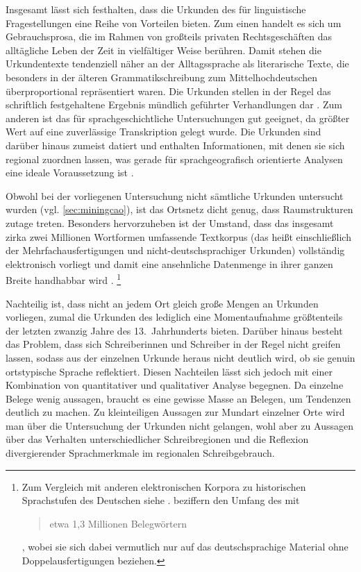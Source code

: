 Insgesamt lässt sich festhalten, dass die Urkunden des \CAO{} für
linguistische Fragestellungen eine Reihe von Vorteilen bieten. Zum einen
handelt es sich um Gebrauchsprosa, die im Rahmen von großteils privaten
Rechtsgeschäften das alltägliche Leben der Zeit in vielfältiger Weise berühren.
Damit stehen die Urkundentexte tendenziell näher an der Alltagssprache als
literarische Texte, die besonders in der älteren Grammatikschreibung zum
Mittelhochdeutschen überproportional repräsentiert waren. Die Urkunden stellen
in der Regel das schriftlich festgehaltene Ergebnis mündlich geführter
Verhandlungen dar \autocite[595]{schmidtwiegand1998b}. Zum anderen ist das
\CAO{} für sprachgeschichtliche Untersuchungen gut geeignet, da
größter Wert auf eine zuverlässige Transkription gelegt wurde. Die Urkunden
sind darüber hinaus zumeist datiert und enthalten Informationen, mit denen sie
sich regional zuordnen lassen, was gerade für sprachgeografisch orientierte
Analysen eine ideale Voraussetzung ist \autocite[22]{schulze2011}.

Obwohl bei der vorliegenen Untersuchung nicht sämtliche Urkunden untersucht
wurden (vgl. \cref{sec:miningcao}), ist das Ortsnetz dicht genug, dass
Raumstrukturen zutage treten. Besonders hervorzuheben ist der Umstand, dass das
insgesamt zirka zwei Millionen Wortformen umfassende Textkorpus (das heißt
einschließlich der Mehrfachausfertigungen und nicht-deutschsprachiger Urkunden)
vollständig elektronisch vorliegt \autocites{gniffkerapp2005}{cao-online} und
damit eine ansehnliche Datenmenge in ihrer ganzen Breite handhabbar wird
\autocite{beckerschallert2021,beckerschallert2022b}.%
%
	\footnote{Zum Vergleich mit anderen elektronischen Korpora zu historischen
	Sprachstufen des Deutschen siehe \citet{dipper2015}.
	\citet[391]{gniffkerapp2005} beziffern den Umfang des \CAO{} mit
	\blockquote{etwa 1,3 Millionen Belegwörtern}, wobei sie sich dabei
	vermutlich nur auf das deutschsprachige Material ohne Doppelausfertigungen
	beziehen.} %

Nachteilig ist, dass nicht an jedem Ort gleich große Mengen an Urkunden
vorliegen, zumal die Urkunden des \CAO{} lediglich eine Momentaufnahme
größtenteils der letzten zwanzig Jahre des 13.~Jahrhunderts bieten. Darüber
hinaus besteht das Problem, dass sich Schreiberinnen und Schreiber in der Regel
nicht greifen lassen, sodass aus der einzelnen Urkunde heraus nicht deutlich
wird, ob sie genuin ortstypische Sprache reflektiert. Diesen Nachteilen lässt
sich jedoch mit einer Kombination von quantitativer und qualitativer Analyse
begegnen. Da einzelne Belege wenig aussagen, braucht es eine gewisse Masse an
Belegen, um Tendenzen deutlich zu machen.
Zu kleinteiligen Aus\-sagen zur Mundart einzelner Orte wird man über die
Untersuchung der Urkunden nicht gelangen, wohl aber zu Aussagen über das
Verhalten unterschiedlicher Schreibregionen und die Reflexion divergierender
Sprachmerkmale im regionalen Schreibgebrauch.

